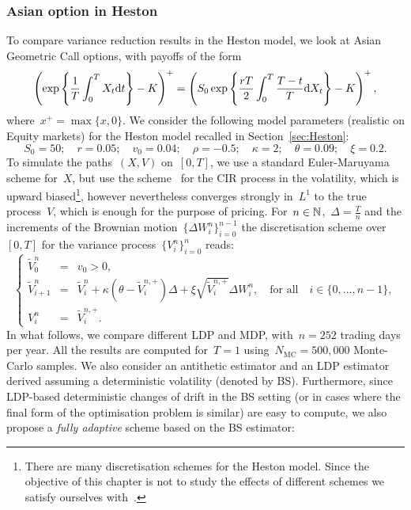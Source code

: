 \subsubsection{Asian option in Heston}
To compare variance reduction results in the Heston model, we look at Asian Geometric Call options, with payoffs of the form
\[
\left(\exp\left\{\frac{1}{T}\int_0^T X_t\mathrm{d} t\right\} - K\right)^+ = \left(S_0 \exp\left \{\frac{rT}{2}\int_0^T\frac{T-t}{T}\mathrm{d} X_t\right \} - K\right)^+,
\]
where~$x^+ = \max\{x,0\}$. 
We consider the following model parameters 
(realistic on Equity markets)
for the Heston model recalled in Section~\ref{sec:Heston}:
$$
S_0 = 50; \quad
r = 0.05; \quad
v_0 = 0.04; \quad
\rho = -0.5; \quad 
\kappa = 2; \quad
\theta = 0.09; \quad 
\xi = 0.2.
$$
To simulate the paths~$(X,V)$ on~$[0,T]$, 
we use a standard Euler-Maruyama scheme for~$X$, but use the scheme~\cite{Lord2009AModels} for the CIR process in the volatility, 
which is upward biased\footnote{There are many discretisation schemes for the Heston model. 
Since the objective of this chapter is not to study the effects of different schemes we satisfy ourselves with~\cite{Lord2009AModels}.}, however nevertheless converges strongly in~$L^1$ to the true process~$V$, which is enough for the purpose of pricing. For~$n\in\mathbb{N}$,~$\Delta =\frac{T}{n}$ and the increments of the Brownian motion~$\{\Delta W_{i}^n\}_{i=0}^{n-1}$ the discretisation scheme over~$[0,T]$ for the variance process~$\{V_i^n\}_{i=0}^n$ reads:
\begin{equation*}
\left\{
\begin{array}{rcl}
\widetilde{V}_{0}^n & = & v_0>0,\\
\widetilde{V}_{i+1}^n & = & \widetilde{V}_{i}^n + \kappa \left(\theta - \widetilde{V}_{i}^{n,+}\right)\Delta + \xi \sqrt{\widetilde{V}_{i}^{n,+}}\Delta W_{i}^n, \quad \text{for all} \quad i\in\{0,\dots,n-1\},\\
V_{i}^n & = & \widetilde{V}_{i}^{n,+}.
\end{array}
\right.
\end{equation*}
In what follows, we compare different LDP and MDP, with~$n=252$ trading days per year. 
All the results are computed for~$T=1$ using~$N_{\text{MC}}=500,000$ Monte-Carlo samples. 
We also consider an antithetic estimator and an LDP estimator derived assuming a deterministic volatility (denoted by BS).
Furthermore, since LDP-based deterministic changes of drift in the BS setting (or in cases where the final form of the optimisation problem is similar) are easy to compute, we also propose a \textit{fully adaptive} scheme based on the BS estimator: 
